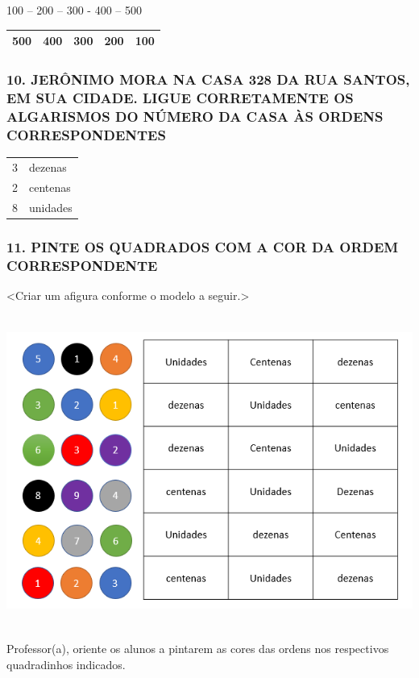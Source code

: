 100 -- 200 -- 300 - 400 -- 500

\begin{longtable}[]{@{}lllll@{}}
\toprule
500 & 400 & 300 & 200 & 100\tabularnewline
\bottomrule
\end{longtable}

\subsubsection{10. JERÔNIMO MORA NA CASA 328 DA RUA SANTOS, EM SUA
CIDADE. LIGUE CORRETAMENTE OS ALGARISMOS DO NÚMERO DA CASA ÀS ORDENS
CORRESPONDENTES}\label{jeruxf4nimo-mora-na-casa-328-da-rua-santos-em-sua-cidade.-ligue-corretamente-os-algarismos-do-nuxfamero-da-casa-uxe0s-ordens-correspondentes}

\begin{longtable}[]{@{}ll@{}}
\toprule
3 & dezenas\tabularnewline
2 & centenas\tabularnewline
8 & unidades\tabularnewline
\bottomrule
\end{longtable}

\subsubsection{11. PINTE OS QUADRADOS COM A COR DA ORDEM CORRESPONDENTE
}\label{pinte-os-quadrados-com-a-cor-da-ordem-correspondente}

\textless{}Criar um afigura conforme o modelo a seguir.\textgreater{}

\includegraphics[width=5.90556in,height=4.02083in]{media/image8.png}

Professor(a), oriente os alunos a pintarem as cores das ordens nos
respectivos quadradinhos indicados.


